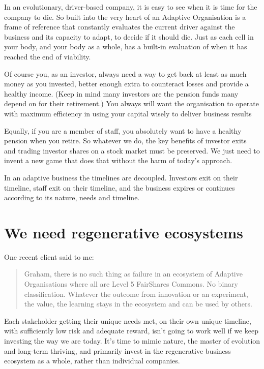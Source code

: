 In an evolutionary, driver-based company, it is easy to see when it is time for the company to die. So built into the very heart of an Adaptive Organisation is a frame of reference that constantly evaluates the current driver against the business and its capacity to adapt, to decide if it should die. Just as each cell in your body, and your body as a whole, has a built-in evaluation of when it has reached the end of viability. 


Of course you, as an investor, always need a way to get back at least as much money as you invested, better enough extra to counteract losses and provide a healthy income. (Keep in mind many investors are the pension funds many depend on for their retirement.) You always will want the organisation to operate with maximum efficiency in using your capital wisely to deliver business results 


Equally, if you are a member of staff, you absolutely want to have a healthy pension when you retire. So whatever we do, the key benefits of investor exits and trading investor shares on a stock market must be preserved. We just need to invent a new game that does that without the harm of today's approach.


In an adaptive business the timelines are decoupled. Investors exit on their timeline, staff exit on their timeline, and the business expires or continues according to its nature, needs and timeline.


\section{We need regenerative ecosystems}
\label{section:incubating-regenerative-ecosystems} 


One recent client said to me: 


\begin{quotation}
Graham, there is no such thing as failure in an ecosystem of Adaptive Organisations where all are Level 5 FairShares Commons. No binary classification. Whatever the outcome from innovation or an experiment, the value, the learning stays in the ecosystem and can be used by others. 
\end{quotation}


Each stakeholder getting their unique needs met, on their own unique timeline, with sufficiently low risk and adequate reward, isn't going to work well if we keep investing the way we are today. It's time to mimic nature, the master of evolution and long-term thriving, and primarily invest in the regenerative business ecosystem as a whole, rather than individual companies. 



